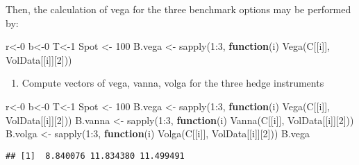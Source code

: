 \documentclass[
]{article}
\newenvironment{Shaded}{\begin{snugshade}}{\end{snugshade}}
\newcommand{\ControlFlowTok}[1]{\textcolor[rgb]{0.13,0.29,0.53}{\textbf{#1}}}
\newcommand{\DecValTok}[1]{\textcolor[rgb]{0.00,0.00,0.81}{#1}}
\newcommand{\FunctionTok}[1]{\textcolor[rgb]{0.00,0.00,0.00}{#1}}
\newcommand{\NormalTok}[1]{#1}
\newcommand{\OtherTok}[1]{\textcolor[rgb]{0.56,0.35,0.01}{#1}}
\newcommand{\SpecialCharTok}[1]{\textcolor[rgb]{0.00,0.00,0.00}{#1}}
\providecommand{\tightlist}{%
  \setlength{\itemsep}{0pt}\setlength{\parskip}{0pt}}
\begin{document}
Then, the calculation of vega for the three benchmark options may be
performed by:

\begin{Shaded}
\begin{Highlighting}[]
\NormalTok{r}\OtherTok{\textless{}{-}}\DecValTok{0}
\NormalTok{b}\OtherTok{\textless{}{-}}\DecValTok{0}
\NormalTok{T}\OtherTok{\textless{}{-}}\DecValTok{1}
\NormalTok{Spot }\OtherTok{\textless{}{-}} \DecValTok{100}
\NormalTok{B.vega }\OtherTok{\textless{}{-}} \FunctionTok{sapply}\NormalTok{(}\DecValTok{1}\SpecialCharTok{:}\DecValTok{3}\NormalTok{, }\ControlFlowTok{function}\NormalTok{(i) }\FunctionTok{Vega}\NormalTok{(C[[i]], VolData[[i]][}\DecValTok{2}\NormalTok{]))}
\end{Highlighting}
\end{Shaded}

\begin{enumerate}
\def\labelenumi{\arabic{enumi}.}
\setcounter{enumi}{1}
\tightlist
\item
  Compute vectors of vega, vanna, volga for the three hedge instruments
\end{enumerate}

\begin{Shaded}
\begin{Highlighting}[]
\NormalTok{r}\OtherTok{\textless{}{-}}\DecValTok{0}
\NormalTok{b}\OtherTok{\textless{}{-}}\DecValTok{0}
\NormalTok{T}\OtherTok{\textless{}{-}}\DecValTok{1}
\NormalTok{Spot }\OtherTok{\textless{}{-}} \DecValTok{100}
\NormalTok{B.vega }\OtherTok{\textless{}{-}} \FunctionTok{sapply}\NormalTok{(}\DecValTok{1}\SpecialCharTok{:}\DecValTok{3}\NormalTok{, }\ControlFlowTok{function}\NormalTok{(i) }\FunctionTok{Vega}\NormalTok{(C[[i]], VolData[[i]][}\DecValTok{2}\NormalTok{]))}
\NormalTok{B.vanna }\OtherTok{\textless{}{-}} \FunctionTok{sapply}\NormalTok{(}\DecValTok{1}\SpecialCharTok{:}\DecValTok{3}\NormalTok{, }\ControlFlowTok{function}\NormalTok{(i) }\FunctionTok{Vanna}\NormalTok{(C[[i]], VolData[[i]][}\DecValTok{2}\NormalTok{]))}
\NormalTok{B.volga }\OtherTok{\textless{}{-}} \FunctionTok{sapply}\NormalTok{(}\DecValTok{1}\SpecialCharTok{:}\DecValTok{3}\NormalTok{, }\ControlFlowTok{function}\NormalTok{(i) }\FunctionTok{Volga}\NormalTok{(C[[i]], VolData[[i]][}\DecValTok{2}\NormalTok{]))}
\NormalTok{B.vega}
\end{Highlighting}
\end{Shaded}

\begin{verbatim}
## [1]  8.840076 11.834380 11.499491
\end{verbatim}
\end{document}
